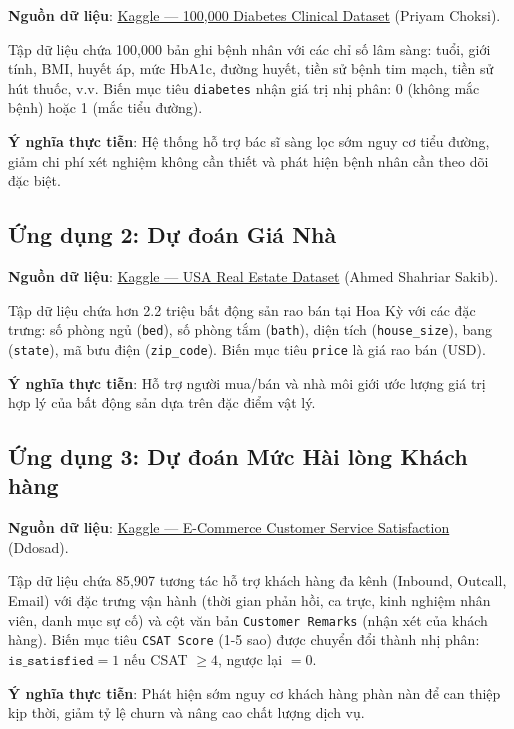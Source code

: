 \documentclass[12pt, a4paper]{article}
\begin{document}
\textbf{Nguồn dữ liệu}: \href{https://www.kaggle.com/datasets/priyamchoksi/100000-diabetes-clinical-dataset}{Kaggle — 100,000 Diabetes Clinical Dataset} (Priyam Choksi).

Tập dữ liệu chứa 100,000 bản ghi bệnh nhân với các chỉ số lâm sàng: tuổi, giới tính, BMI, huyết áp, mức HbA1c, đường huyết, tiền sử bệnh tim mạch, tiền sử hút thuốc, v.v. Biến mục tiêu \texttt{diabetes} nhận giá trị nhị phân: 0 (không mắc bệnh) hoặc 1 (mắc tiểu đường).

\textbf{Ý nghĩa thực tiễn}: Hệ thống hỗ trợ bác sĩ sàng lọc sớm nguy cơ tiểu đường, giảm chi phí xét nghiệm không cần thiết và phát hiện bệnh nhân cần theo dõi đặc biệt.

\subsection{Ứng dụng 2: Dự đoán Giá Nhà}

\textbf{Nguồn dữ liệu}: \href{https://www.kaggle.com/datasets/ahmedshahriarsakib/usa-real-estate-dataset}{Kaggle — USA Real Estate Dataset} (Ahmed Shahriar Sakib).

Tập dữ liệu chứa hơn 2.2 triệu bất động sản rao bán tại Hoa Kỳ với các đặc trưng: số phòng ngủ (\texttt{bed}), số phòng tắm (\texttt{bath}), diện tích (\texttt{house\_size}), bang (\texttt{state}), mã bưu điện (\texttt{zip\_code}). Biến mục tiêu \texttt{price} là giá rao bán (USD).

\textbf{Ý nghĩa thực tiễn}: Hỗ trợ người mua/bán và nhà môi giới ước lượng giá trị hợp lý của bất động sản dựa trên đặc điểm vật lý.

\subsection{Ứng dụng 3: Dự đoán Mức Hài lòng Khách hàng}

\textbf{Nguồn dữ liệu}: \href{https://www.kaggle.com/datasets/ddosad/ecommerce-customer-service-satisfaction/data}{Kaggle — E-Commerce Customer Service Satisfaction} (Ddosad).

Tập dữ liệu chứa 85,907 tương tác hỗ trợ khách hàng đa kênh (Inbound, Outcall, Email) với đặc trưng vận hành (thời gian phản hồi, ca trực, kinh nghiệm nhân viên, danh mục sự cố) và cột văn bản \texttt{Customer Remarks} (nhận xét của khách hàng). Biến mục tiêu \texttt{CSAT Score} (1-5 sao) được chuyển đổi thành nhị phân: $\texttt{is\_satisfied} = 1$ nếu CSAT $\geq 4$, ngược lại $= 0$.

\textbf{Ý nghĩa thực tiễn}: Phát hiện sớm nguy cơ khách hàng phàn nàn để can thiệp kịp thời, giảm tỷ lệ churn và nâng cao chất lượng dịch vụ.
\end{document}
